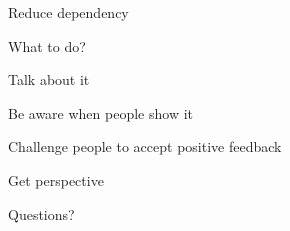 \documentclass[aspectratio=169]{beamer}
\begin{document}
\begin{frame}
  \begin{center}
    \Huge Reduce dependency
    \\ \small \cite{langford93}
  \end{center}
\end{frame}

\begin{frame}
  \begin{center}
    \Huge What to do?
  \end{center}
\end{frame}

\begin{frame}
  \begin{center}
    \Huge Talk about it
  \end{center}
\end{frame}

\begin{frame}
  \begin{center}
    \Huge Be aware when people show it
  \end{center}
\end{frame}

\begin{frame}
  \begin{center}
    \Huge Challenge people to accept positive feedback
  \end{center}
\end{frame}

\begin{frame}
  \begin{center}
    \Huge Get perspective
  \end{center}
\end{frame}

\begin{frame}
  \begin{center}
    \Huge Questions?
  \end{center}
\end{frame}

\begin{frame}
 

  
\end{frame}
\end{document}

